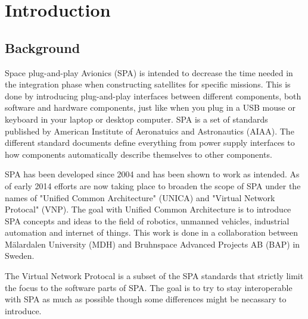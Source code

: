 \chapter{Introduction}

\section{Background}


Space plug-and-play Avionics (SPA) is intended to decrease the time needed in
the integration phase when constructing satellites for specific missions. This
is done by introducing plug-and-play interfaces between different components,
both software and hardware components, just like when you plug in a USB mouse
or keyboard in your laptop or desktop computer. SPA is a set of standards
published by American Institute of Aeronatuics and Astronautics (AIAA). The
different standard documents define everything from power supply interfaces to
how components automatically describe themselves to other components.


SPA has been developed since 2004 and has been shown to work as intended. As of
early 2014 efforts are now taking place to broaden the scope of SPA under the
names of "Unified Common Architecture" (UNICA) and "Virtual Network Protocal"
(VNP). The goal with Unified Common Architecture is to introduce SPA concepts
and ideas to the field of robotics, unmanned vehicles, industrial automation
and internet of things. This work is done in a collaboration between
M\"{a}lardalen University (MDH) and Bruhnspace Advanced Projects AB (BAP) in
Sweden.


The Virtual Network Protocal is a subset of the SPA standards that
strictly limit the focus to the software parts of SPA. The goal is to try to
stay interoperable with SPA as much as possible though some differences might
be necassary to introduce.


